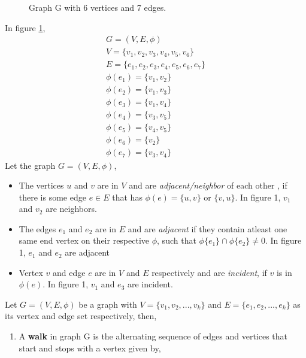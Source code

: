 \begin{itemize}
\begin{figure}[h!]
\caption{Graph G with 6 vertices and 7 edges.}
\label{graph1}
\end{figure}
In figure \ref{graph1}, 
\begin{equation}
\begin{array}{l}
G=(V,E,\phi) \\
V=\{v_1,v_2,v_3,v_4,v_5,v_6\} \\
E=\{e_1,e_2,e_3,e_4,e_5,e_6,e_7\} \\
\phi(e_1)=\{v_1,v_2\} \\
\phi(e_2)=\{v_1,v_3\} \\
\phi(e_3)=\{v_1,v_4\} \\
\phi(e_4)=\{v_3,v_5\} \\
\phi(e_5)=\{v_4,v_5\} \\
\phi(e_6)=\{v_2\} \\
\phi(e_7)=\{v_3,v_4\}
\end{array}
\end{equation}
\newpage
Let the graph $G=(V,E,\phi)$,
	\begin{itemize}
\item The vertices $u$ and $v$ are in $V$ and are \textit{adjacent/neighbor} of each other , if there is some edge $e \in E$ that has $\phi(e)=\{u,v\}$ or $\{v,u\}$. In figure 1, $v_1$ and $v_2$ are neighbors.
\item The edges $e_1$ and $e_2$ are in $E$ and are \textit{adjacent} if they contain atleast one same end vertex on their respective $\phi$, such that $\phi\{e_1\} \cap \phi\{e_2\} \neq 0$. In figure 1, $e_1$ and $e_2$ are adjacent
\item Vertex $v$ and edge $e$ are in $V$ and $E$ respectively and are \textit{incident}, if $v$ is in $\phi(e)$. In figure 1, $v_1$ and $e_3$ are incident.
\end{itemize}
Let $G=(V,E,\phi)$ be a graph with $V=\{v_1,v_2,...,v_k\}$ and $E=\{e_1,e_2,...,e_k\}$ as its vertex and edge set respectively, then,
\begin{enumerate}
	\item A \textbf{walk} in graph G is the alternating sequence of edges and vertices that start and stops with a vertex given by,

\end{enumerate}
\end{itemize}
